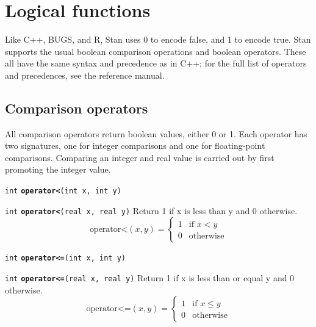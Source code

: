 \documentclass[
  10pt,
]{book}
\begin{document}
\hypertarget{logical-functions}{%
\section{Logical functions}\label{logical-functions}}

Like C++, BUGS, and R, Stan uses 0 to encode false, and 1 to encode
true. Stan supports the usual boolean comparison operations and
boolean operators. These all have the same syntax and precedence as
in C++; for the full list of operators and precedences, see the
reference manual.

\hypertarget{comparison-operators}{%
\subsection{Comparison operators}\label{comparison-operators}}

All comparison operators return boolean values, either 0 or 1. Each
operator has two signatures, one for integer comparisons and one for
floating-point comparisons. Comparing an integer and real value is
carried out by first promoting the integer value.


\texttt{int} \textbf{\texttt{operator\textless{}}}\texttt{(int\ x,\ int\ y)}\newline


\texttt{int} \textbf{\texttt{operator\textless{}}}\texttt{(real\ x,\ real\ y)}\newline
Return 1 if x is less than y and 0 otherwise. \[ \text{operator<}(x,y)
= \begin{cases} 1 & \text{if $x < y$} \\ 0 & \text{otherwise}
\end{cases} \]


\texttt{int} \textbf{\texttt{operator\textless{}=}}\texttt{(int\ x,\ int\ y)}\newline


\texttt{int} \textbf{\texttt{operator\textless{}=}}\texttt{(real\ x,\ real\ y)}\newline
Return 1 if x is less than or equal y and 0 otherwise. \[
\text{operator<=}(x,y) = \begin{cases} 1 & \text{if $x \leq y$} \\ 0 &
\text{otherwise} \end{cases} \]
\end{document}
